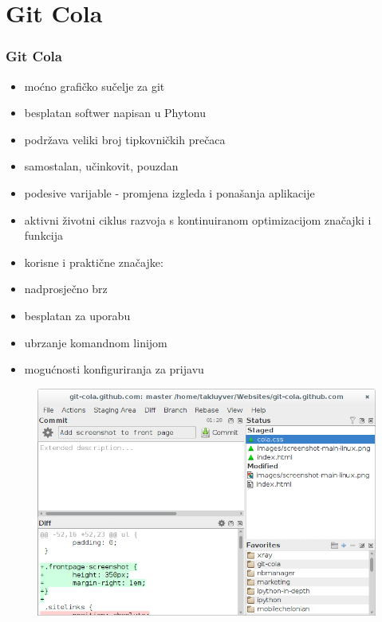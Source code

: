 \section{Git Cola}
\begin{frame}[allowframebreaks]
\frametitle{Git Cola}
 
\begin{itemize}
 \item moćno grafičko sučelje za git
 \item besplatan softwer napisan u Phytonu
 \item podržava veliki broj tipkovničkih prečaca
 \item samostalan, učinkovit, pouzdan
 \item podesive varijable - promjena izgleda i ponašanja aplikacije
 \item aktivni životni ciklus razvoja s kontinuiranom optimizacijom značajki i funkcija
 \framebreak
 \item korisne i praktične značajke:
 		\item nadprosječno brz
 		\item besplatan za uporabu
 		\item ubrzanje komandnom linijom
 		\item mogućnosti konfiguriranja za prijavu
\end{itemize}


\begin{figure}
	\includegraphics[width=0.9\linewidth]{images/git-cola.png}
\end{figure}
\end{frame}
